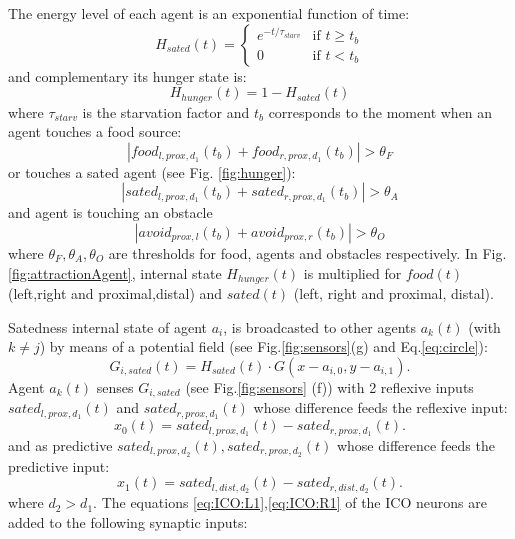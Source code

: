 The energy level of each agent is an exponential function of time:
\begin{equation}
H_{sated}(t)=
  \begin{cases}
   e^{-t/\tau_{starv}} & \text{if } t \geq t_b \\
   0       & \text{if } t < t_b
  \end{cases}
\label{eq:satstate}
\end{equation}
and complementary its hunger state is:
\begin{equation}
H_{hunger}(t)=1-H_{sated}(t)
\end{equation}
where $\tau_{starv}$ is the starvation factor and $t_b$ corresponds to the moment
when an agent touches a food source:
\begin{equation}
|food_{l,prox,d_{1}}(t_{b})+food_{r,prox,d_{1}}(t_{b})|>\theta_{F}
\label{eq:touchfood}
\end{equation}
or touches a sated agent (see Fig. \ref{fig:hunger}):
\begin{equation}
|sated_{l,prox,d_{1}}(t_{b})+sated_{r,prox,d_{1}}(t_{b})|>\theta_{A}
\label{eq:touchagent}
\end{equation}
and agent is touching an obstacle
\begin{equation}
|avoid_{prox,l}(t_{b})+avoid_{prox,r}(t_{b})|>\theta_{O}
\end{equation}
where $\theta_{F},\theta_{A},\theta_{O}$ are thresholds for food, agents and
obstacles respectively.
In Fig. \ref{fig:attractionAgent}, internal state $H_{hunger}(t)$ is multiplied
for $food(t)$ (left,right and proximal,distal) and $sated(t)$ (left, right and proximal, distal).

Satedness internal state of agent $a_{i}$, is broadcasted to other agents
$a_{k}(t)$ (with $k\neq j$) by means of a potential field (see Fig.\ref{fig:sensors}(g) and Eq.\ref{eq:circle}):
\begin{equation}
G_{i,sated}(t)=H_{sated}(t) \cdot G(x-a_{i,0},y-a_{i,1}).
\label{eq:gsated}
\end{equation}
Agent $a_{k}(t)$ senses $G_{i,sated}$ (see Fig.\ref{fig:sensors} (f)) with 2
reflexive inputs $sated_{l,prox,d_{1}}(t)$ and 
$sated_{r,prox,d_{1}}(t)$ whose difference feeds the reflexive input:
\begin{equation}
x_{0}(t)=sated_{l,prox,d_{1}}(t) - sated_{r,prox,d_{1}}(t).
\end{equation}
and as predictive $sated_{l,prox,d_{2}}(t),sated_{r,prox,d_{2}}(t)$ whose
difference feeds the predictive input:
\begin{equation}
x_{1}(t)=sated_{l,dist,d_{2}}(t) - sated_{r,dist,d_{2}}(t).
\label{eq:foodagentpredictive}
\end{equation}
where $d_{2}>d_{1}$.
The equations \ref{eq:ICO:L1},\ref{eq:ICO:R1} of the ICO neurons are added to the
following synaptic inputs:

